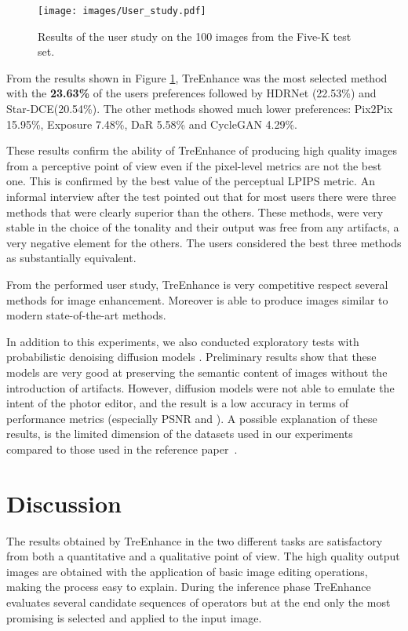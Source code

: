 \documentclass[3p,twocolumn]{elsarticle}
\newcommand{\method}[0]{TreEnhance}
\begin{document}
\begin{figure}
    \centering
    \texttt{[image: images/User\_study.pdf]}
    \caption{Results of the user study on the 100 images from the Five-K test set.}
    \label{fig:user_study}
\end{figure}

From the results shown in Figure \ref{fig:user_study}, \method{} was the most selected method with the \textbf{23.63\%} of the users preferences followed by HDRNet (22.53\%) and Star-DCE(20.54\%). The other methods showed much lower preferences: Pix2Pix 15.95\%, Exposure 7.48\%, DaR 5.58\% and CycleGAN 4.29\%.

These results confirm the ability of \method{} of producing high quality images from a perceptive point of view even if the pixel-level metrics are not the best one. This is confirmed by the best value of the perceptual LPIPS metric.
An informal interview after the test pointed out that for most users there were three methods that were clearly superior than the others. These methods, were very stable in the choice of the tonality and their output was free from any artifacts, a very negative element for the others.
The users considered the best three methods as substantially equivalent.

From the performed user study, \method{} is very competitive respect several methods for image enhancement.  Moreover is able to produce images similar to modern state-of-the-art methods.

In addition to this experiments, we also conducted exploratory  tests with probabilistic denoising diffusion models \cite{saharia2022palette}. Preliminary results show that these models are very good at preserving the semantic content of images without the introduction of artifacts. However, diffusion models were not able to emulate the intent of the photor editor, and the result is a low accuracy in terms of performance metrics (especially PSNR and ). A possible explanation of these results, is the limited dimension of the datasets used in our experiments compared to those used in the reference paper~\cite{saharia2022palette}.







\section{Discussion}
\label{sec:discuss}
The results obtained by \method{} in the two different tasks are satisfactory from both a quantitative and a qualitative point of view. The high quality output images are obtained with the application of basic image editing operations, making the process easy to explain.  During the inference phase \method{} evaluates several candidate sequences of operators but at the end only the most promising is selected and applied to the input image.
\end{document}
